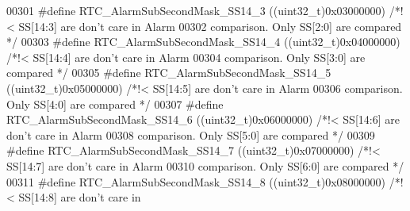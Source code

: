 \begin{DoxyCode}
00301 \textcolor{preprocessor}{#}\textcolor{preprocessor}{define} \textcolor{preprocessor}{RTC\_AlarmSubSecondMask\_SS14\_3}      \textcolor{preprocessor}{(}\textcolor{preprocessor}{(}\textcolor{preprocessor}{uint32\_t}\textcolor{preprocessor}{)}0x03000000\textcolor{preprocessor}{)} \textcolor{comment}{/*!< SS[14:3] are don't care in
       Alarm }
00302 \textcolor{comment}{                                                                       comparison. Only SS[2:0] are
       compared */}
00303 \textcolor{preprocessor}{#}\textcolor{preprocessor}{define} \textcolor{preprocessor}{RTC\_AlarmSubSecondMask\_SS14\_4}      \textcolor{preprocessor}{(}\textcolor{preprocessor}{(}\textcolor{preprocessor}{uint32\_t}\textcolor{preprocessor}{)}0x04000000\textcolor{preprocessor}{)} \textcolor{comment}{/*!< SS[14:4] are don't care in
       Alarm }
00304 \textcolor{comment}{                                                                       comparison. Only SS[3:0] are
       compared */}
00305 \textcolor{preprocessor}{#}\textcolor{preprocessor}{define} \textcolor{preprocessor}{RTC\_AlarmSubSecondMask\_SS14\_5}      \textcolor{preprocessor}{(}\textcolor{preprocessor}{(}\textcolor{preprocessor}{uint32\_t}\textcolor{preprocessor}{)}0x05000000\textcolor{preprocessor}{)} \textcolor{comment}{/*!< SS[14:5] are don't care in
       Alarm }
00306 \textcolor{comment}{                                                                       comparison. Only SS[4:0] are
       compared */}
00307 \textcolor{preprocessor}{#}\textcolor{preprocessor}{define} \textcolor{preprocessor}{RTC\_AlarmSubSecondMask\_SS14\_6}      \textcolor{preprocessor}{(}\textcolor{preprocessor}{(}\textcolor{preprocessor}{uint32\_t}\textcolor{preprocessor}{)}0x06000000\textcolor{preprocessor}{)} \textcolor{comment}{/*!< SS[14:6] are don't care in
       Alarm }
00308 \textcolor{comment}{                                                                       comparison. Only SS[5:0] are
       compared */}
00309 \textcolor{preprocessor}{#}\textcolor{preprocessor}{define} \textcolor{preprocessor}{RTC\_AlarmSubSecondMask\_SS14\_7}      \textcolor{preprocessor}{(}\textcolor{preprocessor}{(}\textcolor{preprocessor}{uint32\_t}\textcolor{preprocessor}{)}0x07000000\textcolor{preprocessor}{)} \textcolor{comment}{/*!< SS[14:7] are don't care in
       Alarm }
00310 \textcolor{comment}{                                                                       comparison. Only SS[6:0] are
       compared */}
00311 \textcolor{preprocessor}{#}\textcolor{preprocessor}{define} \textcolor{preprocessor}{RTC\_AlarmSubSecondMask\_SS14\_8}      \textcolor{preprocessor}{(}\textcolor{preprocessor}{(}\textcolor{preprocessor}{uint32\_t}\textcolor{preprocessor}{)}0x08000000\textcolor{preprocessor}{)} \textcolor{comment}{/*!< SS[14:8] are don't care in
}
\end{DoxyCode}
